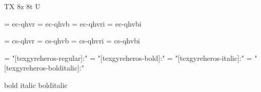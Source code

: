 

\ifx\ffdecl\undefined  \fi

\ffdecl [TG Heros] {\rm \bf \it \bi} {\caps \cond} {} {TX} {8z 8t U}

\def\caps{\ffsetV{caps}{-sc}\ffsetX}  \def\nocaps{\ffsetV{caps}{}\ffsetX}
\def\cond{\ffsetV{cond}{c}\ffsetX}    \def\nocond{\ffsetV{cond}{}\ffsetX}
\def\capsV{} 
\def\condV{} 

\ismacro{}\ifttrue

   \font\tenrm = ec-qhvr  \sizespec
   \font\tenbf = ec-qhvb  \sizespec
   \font\tenit = ec-qhvri \sizespec
   \font\tenbi = ec-qhvbi \sizespec

   \def\ffnamegen{ec-qhv\condV\ffvarV\capsV}

\fi

\ismacro{}\iftrue

   \font\tenrm = cs-qhvr  \sizespec
   \font\tenbf = cs-qhvb  \sizespec
   \font\tenit = cs-qhvri \sizespec
   \font\tenbi = cs-qhvbi \sizespec

   \def\ffnamegen{cs-qhv\condV\ffvarV\capsV}
   

\fi

\ismacro{}\iftrue

   \font\tenrm = "[texgyreheros-regular]:\fontfeatures"    \sizespec
   \font\tenbf = "[texgyreheros-bold]:\fontfeatures"       \sizespec
   \font\tenit = "[texgyreheros-italic]:\fontfeatures"     \sizespec
   \font\tenbi = "[texgyreheros-bolditalic]:\fontfeatures" \sizespec

   \def\ffnamegen{"[texgyreheros\condV-\ffvarV]:\capsV\fontfeatures"} 

    {bold} {italic} {bolditalic}
   \def\caps{\ffsetV{caps}{+smcp;}\ffsetX}
   \def\cond{\ffsetV{cond}{cn}\ffsetX}

\fi
\tenrm %

\def\narrow{\cond\fam}

\ifx\loadmathfonts\relax \endinput \fi
\ifx\mathpreloaded X\else  \fi                     

\endinput

--------------------------------------------------------------

